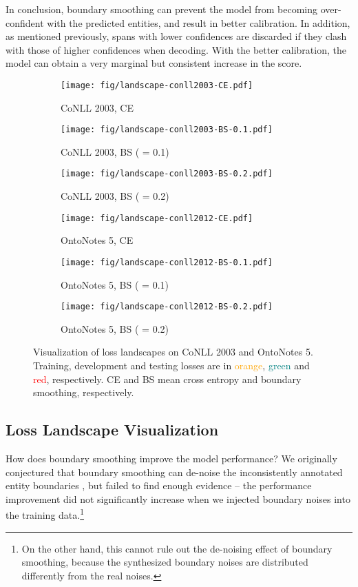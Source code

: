\documentclass[11pt]{article}
\begin{document}
In conclusion, boundary smoothing can prevent the model from becoming over-confident with the predicted entities, and result in better calibration. In addition, as mentioned previously, spans with lower confidences are discarded if they clash with those of higher confidences when decoding. With the better calibration, the model can obtain a very marginal but consistent increase in the  score. 




\begin{figure*}[t]
    \centering
    \begin{subfigure}{0.3\textwidth}
    \centering
    \texttt{[image: fig/landscape-conll2003-CE.pdf]}
    \caption{CoNLL 2003, CE}
    \end{subfigure}
    \begin{subfigure}{0.3\textwidth}
    \centering
    \texttt{[image: fig/landscape-conll2003-BS-0.1.pdf]}
    \caption{CoNLL 2003, BS ( = 0.1)}
    \end{subfigure}
    \begin{subfigure}{0.3\textwidth}
    \centering
    \texttt{[image: fig/landscape-conll2003-BS-0.2.pdf]}
    \caption{CoNLL 2003, BS ( = 0.2)}
    \end{subfigure}
    \begin{subfigure}{0.3\textwidth}
    \centering
    \texttt{[image: fig/landscape-conll2012-CE.pdf]}
    \caption{OntoNotes 5, CE}
    \end{subfigure}
    \begin{subfigure}{0.3\textwidth}
    \centering
    \texttt{[image: fig/landscape-conll2012-BS-0.1.pdf]}
    \caption{OntoNotes 5, BS ( = 0.1)}
    \end{subfigure}
    \begin{subfigure}{0.3\textwidth}
    \centering
    \texttt{[image: fig/landscape-conll2012-BS-0.2.pdf]}
    \caption{OntoNotes 5, BS ( = 0.2)}
    \end{subfigure}
    \caption{Visualization of loss landscapes on CoNLL 2003 and OntoNotes 5. Training, development and testing losses are in \textcolor{orange}{orange}, \textcolor{teal}{green} and \textcolor{red}{red}, respectively. CE and BS mean cross entropy and boundary smoothing, respectively.}
    \label{fig:landscape}
\end{figure*}


\subsection{Loss Landscape Visualization}
How does boundary smoothing improve the model performance? We originally conjectured that boundary smoothing can de-noise the inconsistently annotated entity boundaries \citep{lukasik2020does}, but failed to find enough evidence -- the performance improvement did not significantly increase when we injected boundary noises into the training data.\footnote{On the other hand, this cannot rule out the de-noising effect of boundary smoothing, because the synthesized boundary noises are distributed differently from the real noises.} 
\end{document}
